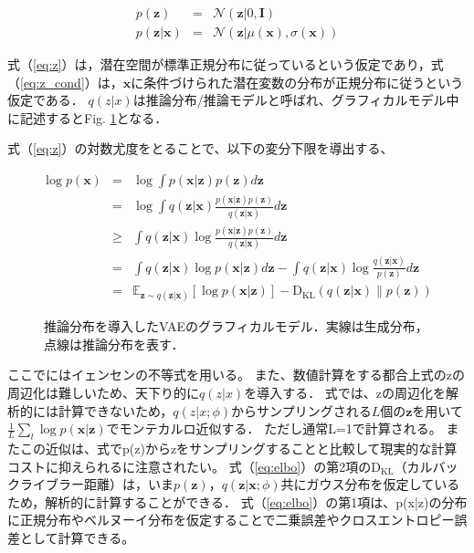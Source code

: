 \begin{eqnarray}
  p(\bm{z}) &=& \mathcal{N}(\bm{z}|0,\bm{I}) \label{eq:z}\\
  p(\bm{z}|\bm{x}) &=& \mathcal{N}(\bm{z}|\mu(\bm{x}),\sigma(\bm{x}))	\label{eq:z_cond}
\end{eqnarray}

式（\ref{eq:z}）は，潜在空間が標準正規分布に従っているという仮定であり，式（\ref{eq:z_cond}）は，$\bm{x}$に条件づけられた潜在変数の分布が正規分布に従うという仮定である．
$q(z|x)$は推論分布/推論モデルと呼ばれ、グラフィカルモデル中に記述するとFig. \ref{fig:vae_cond}となる．

式（\ref{eq:z}）の対数尤度をとることで、以下の変分下限を導出する、

\begin{eqnarray}
  \log p(\bm{x}) &=& \log \int p(\bm{x}|\bm{z}) p(\bm{z}) d\bm{z} \nonumber \\
  &=& \log \int q(\bm{z}|\bm{x}) \frac{p(\bm{x}|\bm{z}) p(\bm{z})}{q(\bm{z}|\bm{x})} d\bm{z} \nonumber \\
  &\geq& \int q(\bm{z}|\bm{x}) \log \frac{p(\bm{x}|\bm{z}) p(\bm{z})}{q(\bm{z}|\bm{x})} d\bm{z} \label{eq:jensen}\\
  &=& \int q(\bm{z}|\bm{x}) \log p(\bm{x}|\bm{z}) d\bm{z} - \int q(\bm{z}|\bm{x}) \log \frac{q(\bm{z}|\bm{x})}{p(\bm{z})} d\bm{z} \nonumber \\
  &=& \mathbb{E}_{\bm{z} \sim q(\bm{z}|\bm{x})} [\log p(\bm{x}|\bm{z})] - \mathrm{D_{KL}}(q(\bm{z}|\bm{x}) \| p(\bm{z})) \label{eq:elbo}
\end{eqnarray}

\begin{figure}[bp]
  \begin{center}
    \caption{推論分布を導入したVAEのグラフィカルモデル．実線は生成分布，点線は推論分布を表す．}
    \label{fig:vae_cond}
  \end{center}
\end{figure}

ここでにはイェンセンの不等式を用いる。
また、数値計算をする都合上式のzの周辺化は難しいため、天下り的に$q(z|x)$を導入する．
式では、zの周辺化を解析的には計算できないため，$q(z|x; \phi)$からサンプリングされる$L$個の$\bm{z}$を用いて$\frac{1}{L} \sum_{l} \log p(\bm{x}|\bm{z})$でモンテカルロ近似する．
ただし通常L=1で計算される。
またこの近似は、式でp(z)からzをサンプリングすることと比較して現実的な計算コストに抑えられるに注意されたい。
式（\ref{eq:elbo}）の第2項の$\mathrm{D_{KL}}$（カルバックライブラー距離）は，いま$p(\bm{z})$，$q(\bm{z}|\bm{x}; \phi)$共にガウス分布を仮定しているため，解析的に計算することができる．
式（\ref{eq:elbo}）の第1項は、p(x|z)の分布に正規分布やベルヌーイ分布を仮定することで二乗誤差やクロスエントロピー誤差として計算できる。

